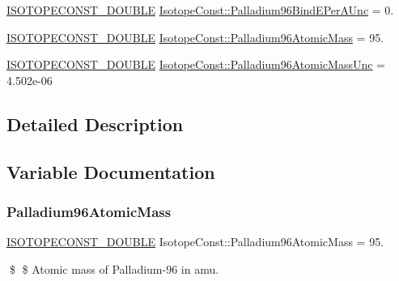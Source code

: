 \begin{DoxyCompactItemize}
\mbox{\hyperlink{group___isotope_const-_macros_ga8f45a7272ce02c0b4c65c44636ed719a}{I\+S\+O\+T\+O\+P\+E\+C\+O\+N\+S\+T\+\_\+\+D\+O\+U\+B\+LE}} \mbox{\hyperlink{group___isotope_const-_palladium-_pd96_ga1f4cd073b1919ed3557d66bfb7f88a2c}{Isotope\+Const\+::\+Palladium96\+Bind\+E\+Per\+A\+Unc}} = 0.
\item 
\mbox{\hyperlink{group___isotope_const-_macros_ga8f45a7272ce02c0b4c65c44636ed719a}{I\+S\+O\+T\+O\+P\+E\+C\+O\+N\+S\+T\+\_\+\+D\+O\+U\+B\+LE}} \mbox{\hyperlink{group___isotope_const-_palladium-_pd96_ga8b185a7c69917835cc9712a009540398}{Isotope\+Const\+::\+Palladium96\+Atomic\+Mass}} = 95.
\item 
\mbox{\hyperlink{group___isotope_const-_macros_ga8f45a7272ce02c0b4c65c44636ed719a}{I\+S\+O\+T\+O\+P\+E\+C\+O\+N\+S\+T\+\_\+\+D\+O\+U\+B\+LE}} \mbox{\hyperlink{group___isotope_const-_palladium-_pd96_gac924772e5bb6a51a0b09b8ac2c0faad5}{Isotope\+Const\+::\+Palladium96\+Atomic\+Mass\+Unc}} = 4.\+502e-\/06
\end{DoxyCompactItemize}


\subsection{Detailed Description}


\subsection{Variable Documentation}
\mbox{\label{group___isotope_const-_palladium-_pd96_ga8b185a7c69917835cc9712a009540398}} 
\subsubsection{\texorpdfstring{Palladium96\+Atomic\+Mass}{Palladium96AtomicMass}}
{\footnotesize\ttfamily \mbox{\hyperlink{group___isotope_const-_macros_ga8f45a7272ce02c0b4c65c44636ed719a}{I\+S\+O\+T\+O\+P\+E\+C\+O\+N\+S\+T\+\_\+\+D\+O\+U\+B\+LE}} Isotope\+Const\+::\+Palladium96\+Atomic\+Mass = 95.}

\$ \$ Atomic mass of Palladium-\/96 in amu. \mbox{\label{group___isotope_const-_palladium-_pd96_gac924772e5bb6a51a0b09b8ac2c0faad5}} 
